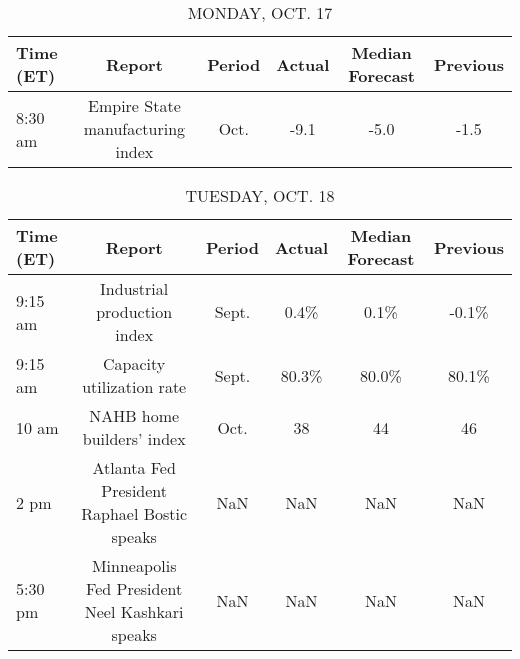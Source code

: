 \documentclass{article}%
\begin{document}
%
\normalsize%


\begin{table}[htbp]%
\caption{MONDAY, OCT. 17}%
\centering%
\begin{adjustbox}{width=1\textwidth}%
\begin{tabular}{lccccc}
\toprule
Time (ET) &                           Report & Period & Actual & Median Forecast & Previous \\
\midrule
  8:30 am & Empire State manufacturing index &   Oct. &   -9.1 &            -5.0 &     -1.5 \\
\bottomrule
\end{tabular}
%
\end{adjustbox}%
\end{table}

%


\begin{table}[htbp]%
\caption{TUESDAY, OCT. 18}%
\centering%
\begin{adjustbox}{width=1\textwidth}%
\begin{tabular}{lccccc}
\toprule
Time (ET) &                                         Report & Period & Actual & Median Forecast & Previous \\
\midrule
  9:15 am &                    Industrial production index &  Sept. &   0.4\% &            0.1\% &    -0.1\% \\
  9:15 am &                      Capacity utilization rate &  Sept. &  80.3\% &           80.0\% &    80.1\% \\
    10 am &                      NAHB home builders' index &   Oct. &     38 &              44 &       46 \\
     2 pm &    Atlanta Fed President Raphael Bostic speaks &    NaN &    NaN &             NaN &      NaN \\
  5:30 pm & Minneapolis Fed President Neel Kashkari speaks &    NaN &    NaN &             NaN &      NaN \\
\bottomrule
\end{tabular}
%
\end{adjustbox}%
\end{table}

%
\end{document}
